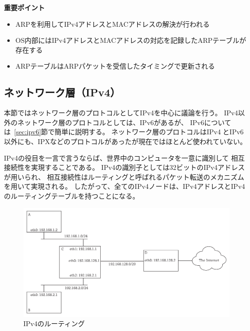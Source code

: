 \begin{itembox}[l]{\bf 重要ポイント}
    \begin{itemize}
        \item ARPを利用してIPv4アドレスとMACアドレスの解決が行われる
        \item OS内部にはIPv4アドレスとMACアドレスの対応を記録したARPテーブルが存在する
        \item ARPテーブルはARPパケットを受信したタイミングで更新される
    \end{itemize}
\end{itembox}

\subsection{ネットワーク層（IPv4）} \label{sec:network}

本節ではネットワーク層のプロトコルとしてIPv4を中心に議論を行う。
IPv4以外のネットワーク層のプロトコルとしては、IPv6があるが、
IPv6については~\ref{sec:ipv6}節で簡単に説明する。
ネットワーク層のプロトコルはIPv4とIPv6以外にも、IPXなどのプロトコルがあったが現在ではほとんど使われていない。

IPv4の役目を一言で言うならば、世界中のコンピュータを一意に識別して
相互接続性を実現することである。
IPv4の識別子としては32ビットのIPv4アドレスが用いられ、
相互接続性はルーティングと呼ばれるパケット転送のメカニズムを用いて実現される。
したがって、全てのIPv4ノードは、IPv4アドレスとIPv4のルーティングテーブルを持つことになる。

\begin{figure}[tb]
    \centering
    \includegraphics[width=15cm,pagebox=artbox]{figs/routing.pdf}
    \caption{IPv4のルーティング}
    \label{fig:routing}
\end{figure}

